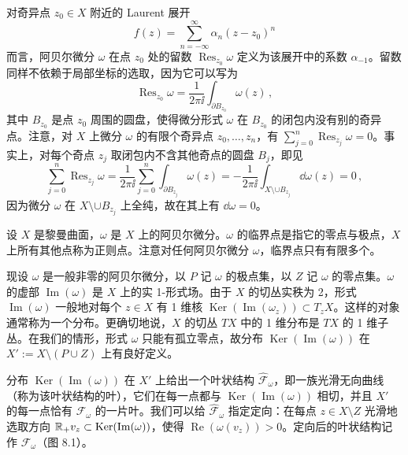 对奇异点 $z_0\in X$ 附近的 Laurent 展开
\[
f(z)=\sum_{n=-\infty}^{\infty}\alpha_n(z-z_0)^n
\]
而言，阿贝尔微分 $\omega$ 在点 $z_0$ 处的留数 $\operatorname{Res}_{z_0}\omega$ 定义为该展开中的系数 $\alpha_{-1}$。留数同样不依赖于局部坐标的选取，因为它可以写为
\[
\operatorname{Res}_{z_0}\omega=\frac{1}{2\pi\ii}\int_{\partial B_{z_0}}\omega(z)\,,
\]
其中 $B_{z_0}$ 是点 $z_0$ 周围的圆盘，使得微分形式 $\omega$ 在 $B_{z_0}$ 的闭包内没有别的奇异点。注意，对 $X$ 上微分 $\omega$ 的有限个奇异点 $z_0,\dots,z_n$，有 $\sum_{j=0}^{n}\operatorname{Res}_{z_j}\omega=0$。事实上，对每个奇点 $z_j$ 取闭包内不含其他奇点的圆盘 $B_j$，即见
\[
\sum_{j=0}^{n}\operatorname{Res}_{z_j}\omega=\frac{1}{2\pi\ii}\sum_{j=0}^{n}\int_{\partial B_{z_j}}\omega(z)=-\frac{1}{2\pi\ii}\int_{X\setminus\cup B_{z_j}}\dd\omega(z)=0\,,
\]
因为微分 $\omega$ 在 $X\setminus\cup B_{z_j}$ 上全纯，故在其上有 $\dd\omega=0$。


\begin{definition}[8.2] 设 $X$ 是黎曼曲面，$\omega$ 是 $X$ 上的阿贝尔微分。$\omega$ 的临界点是指它的零点与极点，$X$ 上所有其他点称为正则点。注意对任何阿贝尔微分 $\omega$，临界点只有有限多个。\end{definition}

现设 $\omega$ 是一般非零的阿贝尔微分，以 $P$ 记 $\omega$ 的极点集，以 $Z$ 记 $\omega$ 的零点集。$\omega$ 的虚部 $\operatorname{Im}(\omega)$ 是 $X$ 上的实 1-形式场。由于 $X$ 的切丛实秩为 2，形式 $\operatorname{Im}(\omega)$ 一般地对每个 $z\in X$ 有 1 维核 $\operatorname{Ker}(\operatorname{Im}(\omega_z))\subset T_zX$。这样的对象通常称为一个分布。更确切地说，$X$ 的切丛 $TX$ 中的 1 维分布是 $TX$ 的 1 维子丛。在我们的情形，形式 $\omega$ 只能有孤立零点，故分布 $\operatorname{Ker}(\operatorname{Im}(\omega))$ 在 $X':=X\setminus(P\cup Z)$ 上有良好定义。

分布 $\operatorname{Ker}(\operatorname{Im}(\omega))$ 在 $X'$ 上给出一个叶状结构 $\hat{\mathcal{F}}_\omega$，即一族光滑无向曲线（称为该叶状结构的叶），它们在每一点都与 $\operatorname{Ker}(\operatorname{Im}(\omega))$ 相切，并且 $X'$ 的每一点恰有 $\hat{\mathcal{F}}_\omega$ 的一片叶。我们可以给 $\hat{\mathcal{F}}_\omega$ 指定定向：在每点 $z\in X\setminus Z$ 光滑地选取方向 $\mathbb{R}_+v_z\subset\operatorname{Ker}(\operatorname{Im}(\omega))$，使得 $\operatorname{Re}(\omega(v_z))>0$。定向后的叶状结构记作 $\mathcal{F}_\omega$（图 8.1）。

